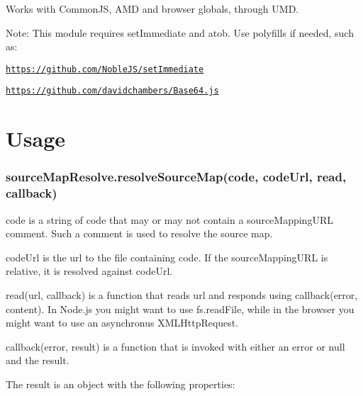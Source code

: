 Works with Common\+JS, A\+MD and browser globals, through U\+MD.

Note\+: This module requires {\ttfamily set\+Immediate} and {\ttfamily atob}. Use polyfills if needed, such as\+:


\begin{DoxyItemize}
\item \href{https://github.com/NobleJS/setImmediate}{\tt https\+://github.\+com/\+Noble\+J\+S/set\+Immediate}
\item \href{https://github.com/davidchambers/Base64.js}{\tt https\+://github.\+com/davidchambers/\+Base64.\+js}
\end{DoxyItemize}

\section*{Usage }

\subsubsection*{{\ttfamily source\+Map\+Resolve.\+resolve\+Source\+Map(code, code\+Url, read, callback)}}


\begin{DoxyItemize}
\item {\ttfamily code} is a string of code that may or may not contain a source\+Mapping\+U\+RL comment. Such a comment is used to resolve the source map.
\item {\ttfamily code\+Url} is the url to the file containing {\ttfamily code}. If the source\+Mapping\+U\+RL is relative, it is resolved against {\ttfamily code\+Url}.
\item {\ttfamily read(url, callback)} is a function that reads {\ttfamily url} and responds using {\ttfamily callback(error, content)}. In Node.\+js you might want to use {\ttfamily fs.\+read\+File}, while in the browser you might want to use an asynchronus {\ttfamily X\+M\+L\+Http\+Request}.
\item {\ttfamily callback(error, result)} is a function that is invoked with either an error or {\ttfamily null} and the result.
\end{DoxyItemize}

The result is an object with the following properties\+:


